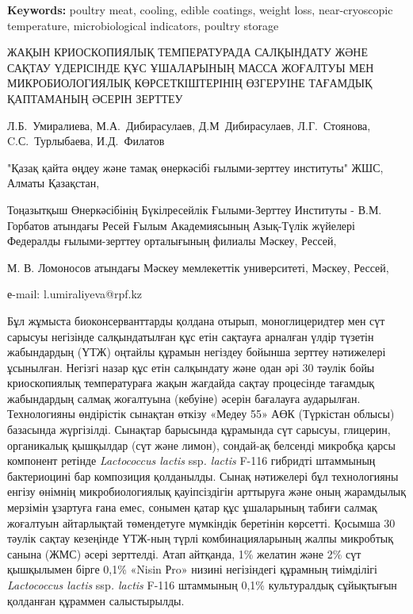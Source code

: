 {\bfseries Keywords:} poultry meat, cooling, edible coatings, weight loss,
near-cryoscopic temperature, microbio\-logical indicators, poultry storage

\begin{header}
ЖАҚЫН КРИОСКОПИЯЛЫҚ ТЕМПЕРАТУРАДА САЛҚЫНДАТУ ЖӘНЕ САҚТАУ ҮДЕРІСІНДЕ ҚҰС ҰШАЛАРЫНЫҢ МАССА ЖОҒАЛТУЫ МЕН МИКРОБИОЛОГИЯЛЫҚ КӨРСЕТКІШТЕРІНІҢ ӨЗГЕРУІНЕ ТАҒАМДЫҚ ҚАПТАМАНЫҢ ӘСЕРІН ЗЕРТТЕУ

Л.Б.~Умиралиева\envelope,
М.А.~Дибирасулаев,
Д.М~Дибирасулаев,
Л.Г.~Стоянова,
C.С.~Турлыбаева,
И.Д.~Филатов
\end{header}

\begin{affil}
"Қазақ қайта өңдеу және тамақ өнеркәсібі ғылыми-зерттеу институты" ЖШС, Алматы Қазақстан,

Тоңазытқыш Өнеркәсібінің Бүкілресейлік Ғылыми-Зерттеу Институты - В.М. Горбатов атындағы Ресей Ғылым Академиясының Азық-Түлік жүйелері Федералды ғылыми-зерттеу орталығының филиалы Мәскеу, Рессей,

М. В. Ломоносов атындағы Мәскеу мемлекеттік университеті, Мәскеу, Рессей,

е-mail: l.umiraliyeva@rpf.kz
\end{affil}

Бұл жұмыста биоконсерванттарды қолдана отырып, моноглицеридтер мен сүт
сарысуы негізінде салқындатылған құс етін сақтауға арналған үлдір
түзетін жабындардың (ҮТЖ) оңтайлы құрамын негіздеу бойынша зерттеу
нәтижелері ұсынылған. Негізгі назар құс етін салқындату және одан әрі 30
тәулік бойы криоскопиялық температураға жақын жағдайда сақтау процесінде
тағамдық жабындардың салмақ жоғалтуына (кебуіне) әсерін бағалауға
аударылған. Технологияны өндірістік сынақтан өткізу «Медеу 55» АӨК
(Түркістан облысы) базасында жүргізілді. Сынақтар барысында құрамында
сүт сарысуы, глицерин, органикалық қышқылдар (сүт және лимон), сондай-ақ
белсенді микробқа қарсы компонент ретінде \emph{Lactococcus lactis}
ssp\emph{. lactis} F-116 гибридті штаммының бактериоцині бар композиция
қолданылды. Сынақ нәтижелері бұл технологияны енгізу өнімнің
микробиологиялық қауіпсіздігін арттыруға және оның жарамдылық мерзімін
ұзартуға ғана емес, сонымен қатар құс ұшаларының табиғи салмақ жоғалтуын
айтарлықтай төмендетуге мүмкіндік беретінін көрсетті. Қосымша 30 тәулік
сақтау кезеңінде ҮТЖ-ның түрлі комбинацияларының жалпы микробтық санына
(ЖМС) әсері зерттелді. Атап айтқанда, 1\% желатин және 2\% сүт
қышқылымен бірге 0,1\% «Nisin Рro» низині негізіндегі құрамның
тиімділігі \emph{Lactococcus lactis} ssp\emph{. lactis} F-116 штаммының
0,1\% культуралдық сұйықтығын қолданған құраммен салыстырылды.

